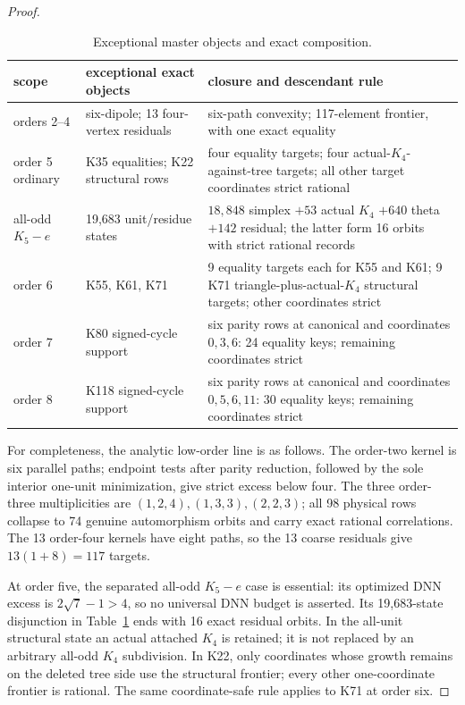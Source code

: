 \documentclass[11pt]{article}
\theoremstyle{remark}
\begin{document}
\begin{proof}
\begin{table}[p]
\centering\small
\begin{tabular}{p{2cm}p{4.1cm}p{7.1cm}}
\toprule
scope&exceptional exact objects&closure and descendant rule\\\midrule
orders 2--4&six-dipole; 13 four-vertex residuals&six-path convexity; 117-element frontier, with one exact equality\\
order 5 ordinary&K35 equalities; K22 structural rows&four equality targets; four actual-$K_4$-against-tree targets; all other target coordinates strict rational\\
all-odd $K_5-e$&19,683 unit/residue states&$18,848$ simplex $+53$ actual $K_4$ $+640$ theta $+142$ residual; the latter form 16 orbits with strict rational records\\
order 6&K55, K61, K71&9 equality targets each for K55 and K61; 9 K71 triangle-plus-actual-$K_4$ structural targets; other coordinates strict\\
order 7&K80 signed-cycle support&six parity rows at canonical and coordinates $0,3,6$: 24 equality keys; remaining coordinates strict\\
order 8&K118 signed-cycle support&six parity rows at canonical and coordinates $0,5,6,11$: 30 equality keys; remaining coordinates strict\\
\bottomrule
\end{tabular}
\caption{Exceptional master objects and exact composition.}\label{tab:masterb}
\end{table}

For completeness, the analytic low-order line is as follows.  The order-two
kernel is six parallel paths; endpoint tests after parity reduction, followed
by the sole interior one-unit minimization, give strict excess below four.
The three order-three multiplicities are $(1,2,4),(1,3,3),(2,2,3)$; all 98
physical rows collapse to 74 genuine automorphism orbits and carry exact
rational correlations.  The 13 order-four kernels have eight paths, so the 13
coarse residuals give $13(1+8)=117$ targets.

At order five, the separated all-odd $K_5-e$ case is essential: its optimized
DNN excess is $2\sqrt7-1>4$, so no universal DNN budget is asserted.  Its
19,683-state disjunction in Table~\ref{tab:masterb} ends with 16 exact residual
orbits.  In the all-unit structural state an actual attached $K_4$ is retained;
it is not replaced by an arbitrary all-odd $K_4$ subdivision.  In K22, only
coordinates whose growth remains on the deleted tree side use the structural
frontier; every other one-coordinate frontier is rational.  The same
coordinate-safe rule applies to K71 at order six.


\end{proof}
\end{document}
